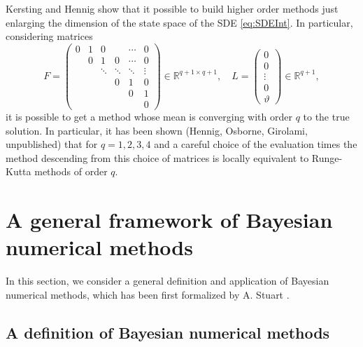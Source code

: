 \documentclass{scrartcl}
\theoremstyle{definition}
\theoremstyle{remark}
\numberwithin{definition}{section}
\numberwithin{remark}{section}
\renewcommand{\theta}{\vartheta}
\newcommand{\R}{\mathbb{R}}
\begin{document}
Kersting and Hennig \cite{KeH16} show that it possible to build higher order methods just enlarging the dimension of the state space of the SDE \eqref{eq:SDEInt}. In particular, considering matrices
\begin{equation}
	F = \begin{pmatrix} 0 & 1 & 0 &   & \cdots & 0 \\
						  & 0 & 1 & 0 & \cdots & 0 \\
						  &   & \ddots & \ddots & \ddots & \vdots \\
						  & & & 0 & 1& 0  \\
						  & & & & 0 & 1 \\
						  & & & & & 0    
		\end{pmatrix} \in \R^{q+1\times q+1}, \quad L = \begin{pmatrix} 0 \\ 0 \\ \vdots \\ 0 \\ \theta \end{pmatrix} \in \R^{q+1}, 
\end{equation}
it is possible to get a method whose mean is converging with order $q$ to the true solution. In particular, it has been shown (Hennig, Osborne, Girolami, unpublished) that for $q = 1,2,3,4$ and a careful choice of the evaluation times the method descending from this choice of matrices is locally equivalent to Runge-Kutta methods of order $q$.

\section{A general framework of Bayesian numerical methods}

In this section, we consider a general definition and application of Bayesian numerical methods, which has been first formalized by A. Stuart \cite{Stu10}.

\subsection{A definition of Bayesian numerical methods}
\end{document}
